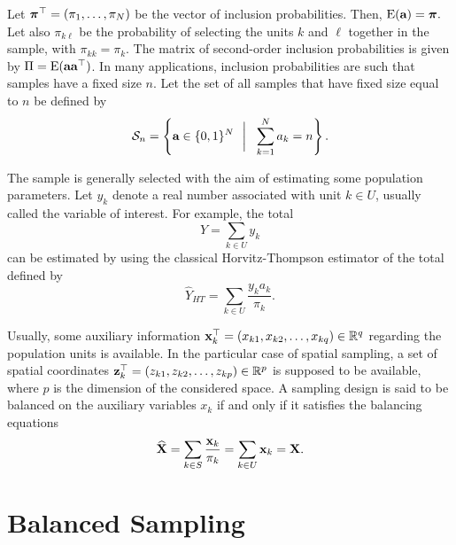 \documentclass[12pt,english]{article}\usepackage[]{graphicx}\usepackage{xcolor}
\begin{document}
Let $\boldsymbol{\pi}^\top=(\pi_1,\dots,\pi_N)$ be the vector of inclusion probabilities. Then, $\textrm{E}({\textbf{a}})=\boldsymbol{\pi}.$ Let also $\pi_{k\ell}$ be the probability of selecting the units $k$ and $\ell$ together in the sample, with $\pi_{kk} = \pi_k$. The matrix of second-order inclusion probabilities is given by $\Pi = {\rm E}(\textbf{a}\textbf{a}^\top)$. In many applications, inclusion probabilities are such that samples have a fixed size $n$. Let the set of all samples that have fixed size equal to $n$ be defined by
 \begin{equation*}\label{eq:sn} \mathcal{S}_n = \left\{ \textbf{a}\in \{0,1\}^N ~~\bigg|~~ \sum_{k
= 1}^N a_k = n \right\} .
 \end{equation*}

The sample is generally selected with the aim of estimating some population parameters. Let $y_k$ denote a real number associated with unit $k\in U$, usually called the variable of interest. For example, the total
$$
Y=\sum_{k\in U} y_k
$$
can be estimated by using the classical Horvitz-Thompson estimator of the total defined by
\begin{equation}\label{eq:HT}
\widehat{Y}_{HT} = \sum_{k\in U} \frac{y_k a_k}{\pi_k}.
\end{equation}


Usually, some auxiliary information ${\bf x}_k^\top = (x_{k1},x_{k2},\dots,x_{kq}) \in\mathbb{R}^q$  regarding the population units is available.
In the particular case of spatial sampling, a set of spatial coordinates  ${\bf z}_k^\top = (z_{k1},z_{k2},\dots,z_{kp}) \in \mathbb{R}^p$ is supposed to be available, where $p$ is the dimension of the considered space. A sampling design is said to be balanced on the auxiliary variables $x_k$ if and only if it satisfies the balancing equations
\begin{equation*}\label{eq:balance}
  \widehat{{\bf X}} = \sum_{k\in S} \frac{{\bf x}_k}{\pi_k} = \sum_{k\in U} {\bf x}_k = {\bf X}.
\end{equation*}


\section{Balanced Sampling}



\end{document}
